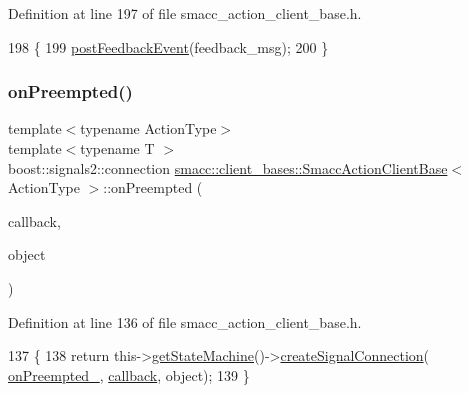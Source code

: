Definition at line 197 of file smacc\+\_\+action\+\_\+client\+\_\+base.\+h.


\begin{DoxyCode}
198     \{
199         \hyperlink{classsmacc_1_1client__bases_1_1SmaccActionClientBase_ac754fb0adfc982fe1adde0d92842a33b}{postFeedbackEvent}(feedback\_msg);
200     \}
\end{DoxyCode}
\mbox{\label{classsmacc_1_1client__bases_1_1SmaccActionClientBase_a7b11af8b2fe1cf75dead6c3a90baefe2}} 
\subsubsection{\texorpdfstring{on\+Preempted()}{onPreempted()}\hspace{0.1cm}{\footnotesize\ttfamily [1/2]}}
{\footnotesize\ttfamily template$<$typename Action\+Type$>$ \\
template$<$typename T $>$ \\
boost\+::signals2\+::connection \hyperlink{classsmacc_1_1client__bases_1_1SmaccActionClientBase}{smacc\+::client\+\_\+bases\+::\+Smacc\+Action\+Client\+Base}$<$ Action\+Type $>$\+::on\+Preempted (\begin{DoxyParamCaption}\item[{void(T\+::$\ast$)(Result\+Const\+Ptr \&)}]{callback,  }\item[{T $\ast$}]{object }\end{DoxyParamCaption})\hspace{0.3cm}{\ttfamily [inline]}}



Definition at line 136 of file smacc\+\_\+action\+\_\+client\+\_\+base.\+h.


\begin{DoxyCode}
137     \{
138         \textcolor{keywordflow}{return} this->\hyperlink{classsmacc_1_1ISmaccClient_aec51d4712404cb9882b86e4c854bb93a}{getStateMachine}()->\hyperlink{classsmacc_1_1ISmaccStateMachine_adf0f42ade0c65cc471960fe2a7c42da2}{createSignalConnection}(
      \hyperlink{classsmacc_1_1client__bases_1_1SmaccActionClientBase_a23846f928b48b5da809690883044b14b}{onPreempted\_}, \hyperlink{servers_2opencv__perception__node_2opencv__perception__node_8cpp_a050e697bd654facce10ea3f6549669b3}{callback}, \textcolor{keywordtype}{object});
139     \}
\end{DoxyCode}
\mbox{\label{classsmacc_1_1client__bases_1_1SmaccActionClientBase_a2941fe4e9a24a7862fd1cfbc63cbfcfa}} 
